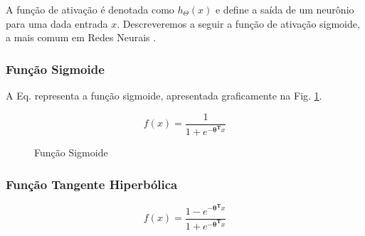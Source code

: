 \cite{activationfun}



A função de ativação é denotada como $h_\Theta (x)$ e define a saída de um neurônio para uma dada entrada $x$. Descreveremos a seguir a função de ativação sigmoide, a mais comum em Redes Neurais \cite{haykin2004comprehensive, haykin2009neural, lecun2015deep}.

\subsubsection{Função Sigmoide}
\label{subsec:sigmoid}

A Eq. representa a função sigmoide, apresentada graficamente na Fig. \ref{fg:funcao_sigmoide}. 


\begin{equation}
  f(x) =  \frac{\mathrm{1} }{\mathrm{1} + e^{- \mathbf{\theta^T}x}}
  \label{fun:sigmoid}
\end{equation}

\begin{center}
    \begin{figure}
        \centering
    \caption{Função Sigmoide}\label{fg:funcao_sigmoide}
	\end{figure}
\end{center}

\subsubsection{Função Tangente Hiperbólica}
\label{subsec:htan}

\begin{equation}
  f(x) =  \frac{\mathrm{1} - e^{- \mathbf{\theta^T}x}}{\mathrm{1} + e^{- \mathbf{\theta^T}x}}
  \label{fun:tanh}
\end{equation}

